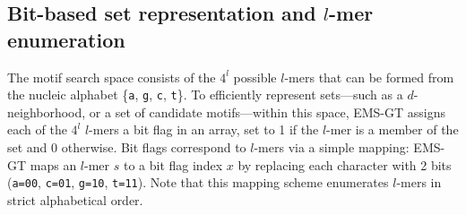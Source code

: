 \documentclass[oneside,12pt]{DISCSthesis}
\begin{document}
		\subsection{Bit-based set representation and $l$-mer enumeration}
			The motif search space consists of the $4^{l}$ possible $l$-mers that can be formed from the nucleic alphabet \{\texttt{a}, \texttt{g}, \texttt{c}, \texttt{t}\}. To efficiently represent sets---such as a $d$-neighborhood, or a set of candidate motifs---within this space, EMS-GT assigns each of the $4^{l}$ $l$-mers a bit flag in an array, set to 1 if the $l$-mer is a member of the set and 0 otherwise. Bit flags correspond to $l$-mers via a simple mapping: EMS-GT maps an $l$-mer $s$ to a bit flag index $x$ by replacing each character with 2 bits (\texttt{a=00}, \texttt{c=01}, \texttt{g=10}, \texttt{t=11}). Note that this mapping scheme enumerates $l$-mers in strict alphabetical order.
\end{document}
